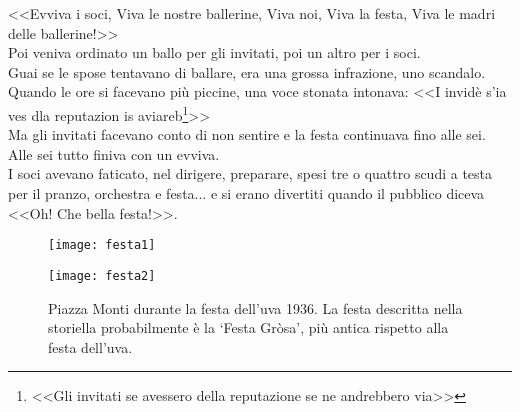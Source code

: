 \indent <<Evviva i soci, Viva le nostre ballerine, Viva noi, Viva la festa, Viva le madri delle ballerine!>>\\
\indent Poi veniva ordinato un ballo per gli invitati, poi un altro per i soci.\\
\indent Guai se le spose tentavano di ballare, era una grossa infrazione, uno scandalo.\\
\indent Quando le ore si facevano più piccine, una voce stonata intonava: <<I invidè s'ia ves dla reputazion is aviareb\footnote{<<Gli invitati se avessero della reputazione se ne andrebbero via>>}>>\\
\indent Ma gli invitati facevano conto di non sentire e la festa continuava fino alle sei. Alle sei tutto finiva con un evviva.\\
\indent I soci avevano faticato, nel dirigere, preparare, spesi tre o quattro scudi a testa per il pranzo, orchestra e festa... e si erano divertiti quando il pubblico diceva <<Oh! Che bella festa!>>.

\begin{figure}[htb]
    \centering
        \texttt{[image: festa1]}
    \vspace{-0.8cm}
\end{figure}

\begin{figure}[htb]
    \centering
    \vspace{-0.45cm}
    \texttt{[image: festa2]}
    \caption[Festa dell'uva]{Piazza Monti durante la festa dell'uva 1936. La festa descritta nella storiella probabilmente è la `Festa Gròsa', più antica rispetto alla festa dell'uva. \label{fig:festa2}}
    \vspace{-0.8cm}
\end{figure}
